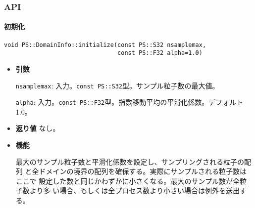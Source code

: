 
\subsubsection{API}


\paragraph{初期化}
\mbox{}

\begin{screen}
\begin{verbatim}
void PS::DomainInfo::initialize(const PS::S32 nsamplemax,
                                const PS::F32 alpha=1.0)
\end{verbatim}
\end{screen}

\begin{itemize}

\item{{\bf 引数}}

{\tt nsamplemax}: 入力。{\tt const PS::S32}型。サンプル粒子数の最大値。

{\tt alpha}: 入力。{\tt const PS::F32}型。指数移動平均の平滑化係数。デフォルト1.0。

\item{{\bf 返り値}}
なし。

\item{{\bf 機能}}

最大のサンプル粒子数と平滑化係数を設定し、サンプリングされる粒子の配列
と全ドメインの境界の配列を確保する。実際にサンプルされる粒子数はここで
設定した数と同じかわずかに小さくなる。最大のサンプル数が全粒子数より多
い場合、もしくは全プロセス数より小さい場合は例外を送出する。

\end{itemize}

